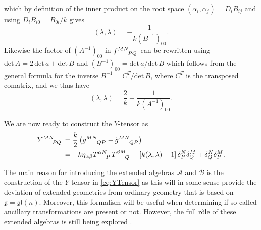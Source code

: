 which by definition of the inner product on the root space $(\alpha_i,\alpha_j)=D_iB_{ij}$ and using $D_iB_{i0}=B_{0i}/k$ gives
\begin{equation}
    (\lambda,\lambda) = -\frac{1}{k(B^{-1})_{00}}. 
\end{equation}
Likewise the factor of $(A^{-1})_{00}$ in $\tensor{f}{^{MN}_{PQ}}$ can be rewritten using $\text{det}\, A=2\,\text{det}\,a+\text{det}\,B$ and $(B^{-1})_{00}=\text{det}\, a/\text{det}\,B$ which follows from the general formula for the inverse $B^{-1}=C^T/\text{det}\, B$, where $C^T$ is the transposed comatrix, and we thus have
\begin{equation}
    (\lambda,\lambda) = \frac{2}{k}-\frac{1}{k(A^{-1})_{00}}.
\end{equation}

We are now ready to construct the $Y$-tensor as 
\begin{equation}\label{eq:YTensor}
    \begin{aligned}
        \tensor{Y}{^{MN}_{PQ}} &= \frac{k}{2}\left(\tensor{g}{^{MN}_{QP}}-\tensor{\tilde{g}}{^{MN}_{QP}}\right)\\
        & = -k\eta_{\alpha\beta}\tensor{T}{^{\alpha N}_P}\tensor{T}{^{\beta M}_Q}+\left[k(\lambda,\lambda)-1\right]\delta^N_P\delta^M_Q+\delta^N_Q\delta^M_P.
    \end{aligned}
\end{equation}

The main reason for introducing the extended algebras $\mathscr{A}$ and $\mathscr{B}$ is the construction of the $Y$-tensor in \eqref{eq:YTensor} as this will in some sense provide the deviation of extended geometries from ordinary geometry that is based on $\mathfrak{g}=\mathfrak{gl}(n)$. Moreover, this formalism will be useful when determining if so-called ancillary transformations are present or not. However, the full rôle of these extended algebras is still being explored \cite{Palmkvist:2013vya,Cederwall:2018aab,HohmZwiebach2013}.

